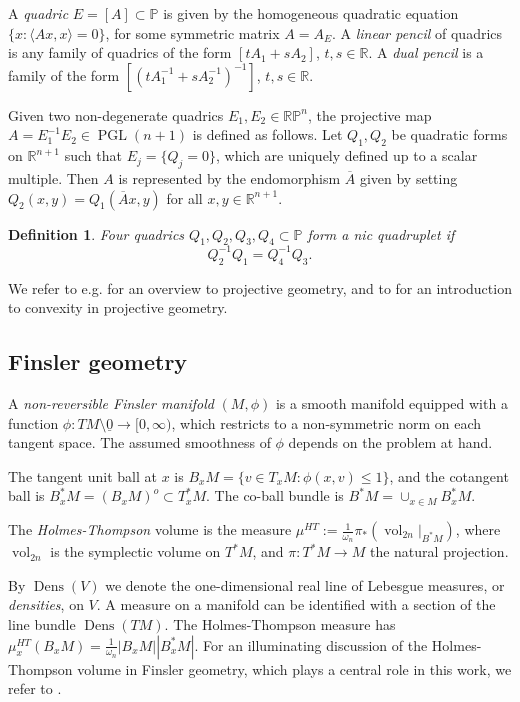 \documentclass[reqno,10pt]{amsart}
\newcounter{mp}
\newtheorem{Definition}[Proposition]{Definition}
\DeclareMathOperator{\vol}{vol}
\DeclareMathOperator{\Dens}{Dens}
\DeclareMathOperator{\PGL}{PGL}
\newcommand{\R}{\mathbb{R}}
\newcommand{\PP}{\mathbb{P}}
\begin{document}
A \emph{quadric} $E=[A]\subset \PP$ is given by the homogeneous quadratic equation $\{x: \langle A x, x\rangle=0\}$, for some symmetric matrix $A=A_E$. A \emph{linear pencil} of quadrics is any family of quadrics of the form $[tA_1+sA_2]$, $t, s\in\R$. 
A \emph{dual pencil} is a family of the form  $[(tA_1^{-1}+sA_2^{-1})^{-1}]$, $t, s\in\R$.

Given two non-degenerate quadrics $E_1, E_2\in\mathbb R\PP^n$, the projective map $A=E_1^{-1}E_2\in\PGL(n+1)$ is defined as follows. Let $Q_1, Q_2$ be quadratic forms on $\R^{n+1}$ such that $E_j=\{Q_j=0\}$, which are uniquely defined up to a scalar multiple. Then $A$ is represented by the endomorphism $\overline A$ given by setting $Q_2(x,y)=Q_1(\overline Ax,y)$ for all $x,y\in\R^{n+1}$.

\begin{Definition}\label{def:harmonic_quadrics}
	Four quadrics $Q_1,Q_2,Q_3,Q_4\subset\PP$ form a \emph{ nic quadruplet} if $$Q_2^{-1}Q_1=Q_4^{-1}Q_3.$$ 
\end{Definition}
We refer to e.g. \cite{projective_book} for an overview to projective geometry, and to \cite{complex_convexity} for an introduction to convexity in projective geometry.

\subsection{Finsler geometry}
A \emph{non-reversible Finsler manifold} $(M,\phi)$ is a smooth manifold equipped with a function $\phi :TM\setminus \underline 0\to [0,\infty)$, which restricts to a non-symmetric norm on each tangent space. The assumed smoothness of $\phi$ depends on the problem at hand.

The tangent unit ball at $x$ is $B_xM=\{v\in T_xM: \phi(x,v)\leq 1\}$, and the cotangent ball  is $B_x^*M=(B_xM)^o\subset T_x^*M$. The co-ball bundle is $B^*M=\cup_{x\in M}B_x^*M$.

The \emph{Holmes-Thompson} volume is the measure $\mu^{HT}:=\frac{1}{\omega_n}\pi_*(\vol_{2n}|_{B^*M})$, where $\vol_{2n}$ is the symplectic volume on $T^*M$, and $\pi:T^*M\to M$ the natural projection.

By $\Dens(V)$ we denote the one-dimensional real line of Lebesgue measures, or \emph{densities}, on $V$. A measure on a manifold can be identified with a section of the line bundle $\Dens(TM)$. The Holmes-Thompson measure has $\mu^{HT}_x(B_xM)=\frac{1}{\omega_n}|B_xM||B^*_xM|$.
For an illuminating discussion of the Holmes-Thompson volume in Finsler geometry, which plays a central role in this work, we refer to \cite{alvarez_thompson, alvarez_berck}.
\end{document}
